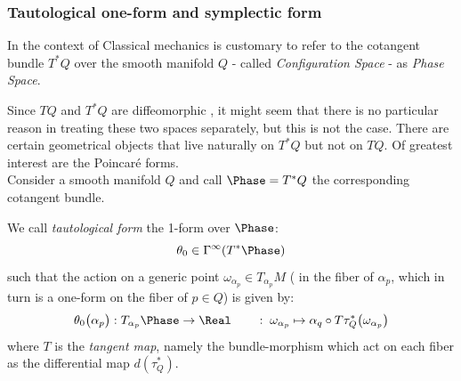 \documentclass[Main]{subfiles}
\begin{document}
			\subsubsection{Tautological one-form and symplectic form}
					\begin{remark}
						In the context of Classical mechanics is customary to refer to the cotangent bundle $T^*Q$ over the smooth manifold  $Q $ - called \emph{Configuration Space}  - as \emph{Phase Space}.
					\end{remark}

					Since $TQ$ and $T^*Q$ are diffeomorphic , it might seem that there is no particular reason in treating these two spaces separately, but this is not the case.
					There are certain geometrical objects that live naturally on $T^*Q$  but not on $TQ$.
					Of greatest interest %
					are the Poincaré forms\cite{Frankel2003}.\\
					Consider a smooth manifold $Q$ and call $\Phase=T^*Q$ the corresponding cotangent bundle.
					\begin{definition}
						We call \emph{tautological form} the 1-form over $\Phase$:
						\begin{displaymath}
							\theta_0 \in \Gamma^\infty (T^*\Phase)
						\end{displaymath}
					such that the action on a generic point $ \omega_{\alpha_p} \in T_{\alpha_p}M$ ( in the fiber of $\alpha_p$, which in turn is a one-form on the fiber of $p\in Q$) is given by:
						\begin{displaymath}
						\theta_0 \big(\alpha_p \big): T_{\alpha_p}\Phase \rightarrow \Real \qquad : \; \omega_{\alpha_p} \mapsto \alpha_q \circ T \tau^*_Q \big( \omega_{\alpha_p} \big)
						\end{displaymath}
					where $T$ is the \emph{tangent map}, namely the bundle-morphism which act on each fiber as the differential map $d (\tau^*_Q)$.
					\end{definition}
\end{document}
